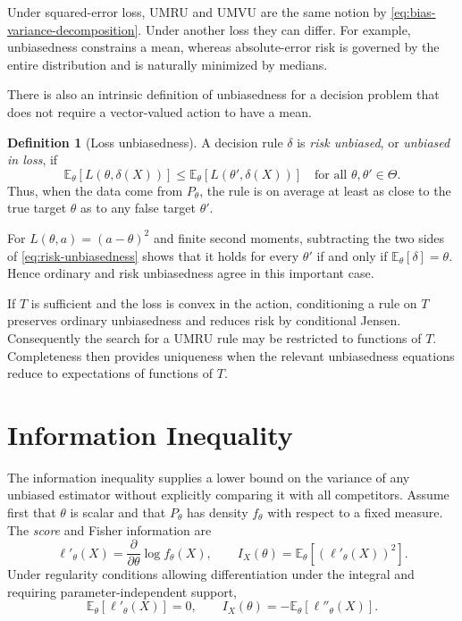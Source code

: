 \documentclass[12pt,oneside]{book}
\numberwithin{equation}{section}
\theoremstyle{definition}
\newtheorem{definition}{Definition}[section]
\theoremstyle{plain}
\theoremstyle{remark}
\newcommand{\E}{\mathbb{E}}
\begin{document}
Under squared-error loss, UMRU and UMVU are the same notion by
\eqref{eq:bias-variance-decomposition}.  Under another loss they can differ.
For example, unbiasedness constrains a mean, whereas absolute-error risk is
governed by the entire distribution and is naturally minimized by medians.

There is also an intrinsic definition of unbiasedness for a decision problem
that does not require a vector-valued action to have a mean.

\begin{definition}[Loss unbiasedness]
A decision rule $\delta$ is \emph{risk unbiased}, or \emph{unbiased in loss},
if
\begin{equation}
    \E_\theta[L(\theta,\delta(X))]
    \leq \E_\theta[L(\theta',\delta(X))]
    \quad\text{for all }\theta,\theta'\in\Theta.
    \label{eq:risk-unbiasedness}
\end{equation}
Thus, when the data come from $P_\theta$, the rule is on average at least as
close to the true target $\theta$ as to any false target $\theta'$.
\end{definition}

For $L(\theta,a)=(a-\theta)^2$ and finite second moments, subtracting the two
sides of \eqref{eq:risk-unbiasedness} shows that it holds for every
$\theta'$ if and only if $\E_\theta[\delta]=\theta$.  Hence ordinary and risk
unbiasedness agree in this important case.

If $T$ is sufficient and the loss is convex in the action, conditioning a
rule on $T$ preserves ordinary unbiasedness and reduces risk by conditional
Jensen.  Consequently the search for a UMRU rule may be restricted to
functions of $T$.  Completeness then provides uniqueness when the relevant
unbiasedness equations reduce to expectations of functions of $T$.

\section{Information Inequality}

The information inequality supplies a lower bound on the variance of any
unbiased estimator without explicitly comparing it with all competitors.
Assume first that $\theta$ is scalar and that $P_\theta$ has density
$f_\theta$ with respect to a fixed measure.  The \emph{score} and Fisher
information are
\[
    \ell'_\theta(X)=\frac{\partial}{\partial\theta}
        \log f_\theta(X),
    \qquad
    I_X(\theta)=\E_\theta[(\ell'_\theta(X))^2].
\]
Under regularity conditions allowing differentiation under the integral and
requiring parameter-independent support,
\[
    \E_\theta[\ell'_\theta(X)]=0,
    \qquad
    I_X(\theta)=-\E_\theta[\ell''_\theta(X)].
\]
\end{document}

